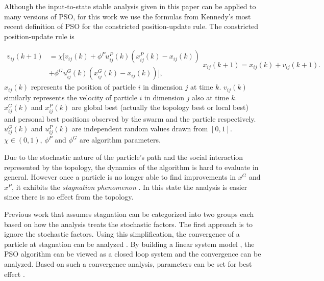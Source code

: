 \documentclass{sig-alternate}
\begin{document}
Although the input-to-state stable analysis given in this paper can be applied to many versions of PSO,
for this work we use the formulas from Kennedy's most recent definition of PSO\cite{4223164} for the constricted position-update rule.
The constricted position-update rule is

\begin{subequations}
\label{eq:pso_alg}
\begin{equation}
\label{eq:up_vel}
\begin{aligned}
v_{ij}(k+1) & = \chi [ v_{ij}(k) 
+ \phi^{P} u^{P}_{ij}(k) (x^{P}_{ij}(k) - x_{ij}(k))
\\ & + \phi^{G} u^{G}_{ij}(k) ( x^{G}_{ij}(k) - x_{ij}(k)) ],
\end{aligned}
\end{equation}
\begin{equation}
\label{eq:up_pos}
x_{ij}(k+1) = x_{ij}(k) + v_{ij}(k+1).
\end{equation}
\end{subequations}
$ x_{ij}(k) $ represents the position of particle $ i $ in dimension $ j $ at time $ k $.
$ v_{ij}(k) $ similarly represents the velocity of particle $ i $ in dimension $ j $ also at time $ k $.
$ x^{G}_{ij}(k) $ and $ x^{P}_{ij}(k) $ are global best (actually the topology best or local best) and personal best positions observed by the swarm and the particle respectively. 
$ u^{G}_{ij}(k) $ and $ u^{P}_{ij}(k) $ are independent random values drawn from $ [0,1] $.
$ \chi \in ( 0, 1 ) $, $ \phi^{P} $ and $ \phi^{G} $ are algorithm parameters.

Due to the stochastic nature of the particle's path and the social interaction represented by the topology, the dynamics of the algorithm is hard to evaluate in general.
However once a particle is no longer able to find improvements in $ x^{G} $ and $ x^{P} $, it exhibits the \emph{stagnation phenomenon} \cite{Clerc06stagnationanalysis}.
In this state the analysis is easier since there is no effect from the topology.

Previous work that assumes stagnation can be categorized into two groups each based on how the analysis treats the stochastic factors.
The first approach is to ignore the stochastic factors.
Using this simplification, the convergence of a particle at stagnation can be analyzed \cite{985692}. 
By building a linear system model \cite{4424687}, the PSO algorithm can be viewed as a closed loop system and the convergence can be analyzed.
Based on such a convergence analysis, parameters can be set for best effect \cite{Trelea2003317}.
\end{document}
